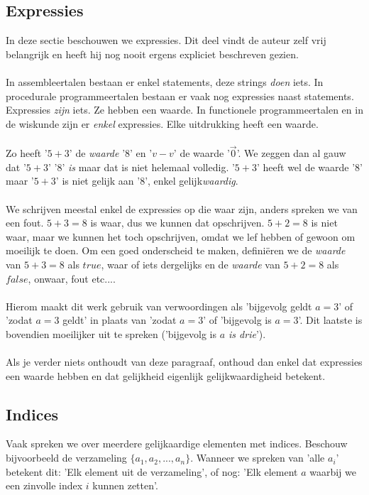 \documentclass[lineaire_algebra_oplossingen.tex]{subfiles}
\begin{document}
\subsection{Expressies}
In deze sectie beschouwen we expressies. Dit deel vindt de auteur zelf vrij belangrijk en heeft hij nog nooit ergens expliciet beschreven gezien.\\\\
In assembleertalen bestaan er enkel statements, deze strings \emph{doen} iets. In procedurale programmeertalen bestaan er vaak nog expressies naast statements. Expressies \emph{zijn} iets. Ze hebben een waarde. In functionele programmeertalen en in de wiskunde zijn er \emph{enkel} expressies. Elke uitdrukking heeft een waarde.\\\\
Zo heeft '$5+3$' de \emph{waarde} '$8$' en '$v-v$' de waarde '$\vec{0}$'. We zeggen dan al gauw dat '$5+3$' '$8$' \emph{is} maar dat is niet helemaal volledig. '$5+3$' heeft wel de waarde '$8$' maar '$5+3$' is niet gelijk aan '$8$', enkel gelijk\emph{waardig}.\\\\
We schrijven meestal enkel de expressies op die waar zijn, anders spreken we van een fout. $5+3=8$ is waar, dus we kunnen dat opschrijven. $5+2=8$ is niet waar, maar we kunnen het toch opschrijven, omdat we lef hebben of gewoon om moeilijk te doen. Om een goed onderscheid te maken, defini\"eren we de \emph{waarde} van $5+3=8$ als $true$, waar of iets dergelijks en de \emph{waarde} van $5+2=8$ als $false$, onwaar, fout etc....\\\\
Hierom maakt dit werk gebruik van verwoordingen als 'bijgevolg geldt $a=3$' of 'zodat $a=3$ geldt' in plaats van 'zodat $a=3$' of 'bijgevolg is $a=3$'.
Dit laatste is bovendien moeilijker uit te spreken ('bijgevolg is \emph{$a$ is drie}').\\\\
Als je verder niets onthoudt van deze paragraaf, onthoud dan enkel dat expressies een waarde hebben en dat gelijkheid eigenlijk gelijkwaardigheid betekent. 

\subsection{Indices}
Vaak spreken we over meerdere gelijkaardige elementen met indices. Beschouw bijvoorbeeld de verzameling $\{a_1,a_2,...,a_n\}$.
Wanneer we spreken van 'alle $a_i$' betekent dit: 'Elk element uit de verzameling', of nog: 'Elk element $a$ waarbij we een zinvolle index $i$ kunnen zetten'.
 
\end{document}
